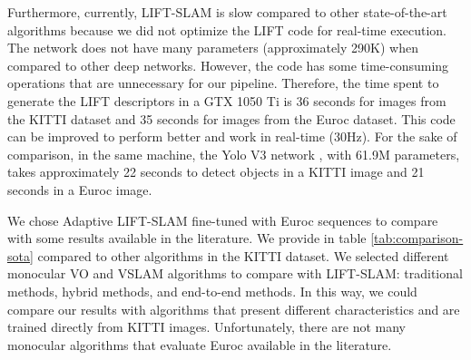 Furthermore, currently, LIFT-SLAM is slow compared to other state-of-the-art algorithms because we did not optimize the LIFT code for real-time execution. The network does not have many parameters (approximately 290K) when compared to other deep networks. However, the code has some time-consuming operations that are unnecessary for our pipeline. Therefore, the time spent to generate the LIFT descriptors in a GTX 1050 Ti is 36 seconds for images from the KITTI dataset and 35 seconds for images from the Euroc dataset. This code can be improved to perform better and work in real-time (30Hz). For the sake of comparison, in the same machine, the Yolo V3 network \cite{yolov3}, with 61.9M parameters, takes approximately 22 seconds to detect objects in a KITTI image and 21 seconds in a Euroc image. 

We chose Adaptive LIFT-SLAM fine-tuned with Euroc sequences to compare with some results available in the literature. We provide in table \ref{tab:comparison-sota} compared to other algorithms in the KITTI dataset. We selected different monocular VO and VSLAM algorithms to compare with LIFT-SLAM: traditional methods, hybrid methods, and end-to-end methods. In this way, we could compare our results with algorithms that present different characteristics and are trained directly from KITTI images. Unfortunately, there are not many monocular algorithms that evaluate Euroc available in the literature. 

